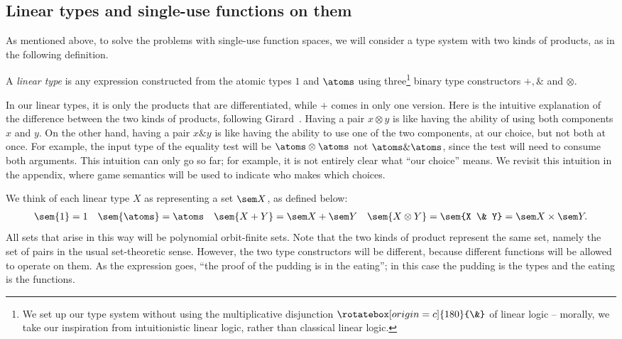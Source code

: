 \subsection{Linear types and single-use functions on them}
\label{sec:linear-types-and-single-use-functions}
As mentioned above, to solve the problems with single-use function spaces, we will consider a type system with two kinds of products, as in the following definition.
\begin{definition}\label{def:datatypes}
    A \emph{linear type} is any expression constructed from the atomic types $1$ and $\atoms$ using three\footnote{We set up our type system without using the multiplicative disjunction $\rotatebox[origin=c]{180}{\&}$ of linear logic -- morally, we take our inspiration from intuitionistic linear logic, rather than classical linear logic.} binary type constructors $+, \&$ and $\otimes$.
\end{definition}
In our linear types, it is only the products that are differentiated, while  $+$ comes in only one version. 
    Here is the intuitive explanation of the difference between the two kinds of products, following Girard~\cite[p.2]{girard1995advances}. Having a pair $x \otimes y$ is like having the ability of using both components $x$ and $y$. On the other hand, having a pair $x \& y$ is like having the ability to use one of the two components, at our choice, but not both at once. For example, the input type of the equality test will be $\atoms \otimes \atoms$ not $\atoms \& \atoms$, since the test will need to consume both arguments. This intuition can only go so far; for example, it is not entirely clear what ``our choice'' means. We revisit this intuition in  the appendix, where game semantics will be used to indicate who makes which choices. 



We think of each linear type $X$ as representing a set $\sem X$, as defined below:
\begin{align*}
    \sem{1} = 1
\quad 
\sem{\atoms} = \atoms 
\quad 
\sem{X+Y} = \sem X + \sem Y 
\quad 
\sem{X \otimes Y} =
\sem{X \& Y} = \sem X \times \sem Y.
\end{align*}
All sets that arise in this way will be polynomial orbit-finite sets.
Note that the two kinds of product represent the same set, namely the set of pairs in the usual set-theoretic sense. 
However, the two type constructors will be  different, because different functions will be allowed to operate on them. As the expression goes, ``the proof of the pudding is in the eating''; in this case the pudding is the types and the eating is the functions.  

